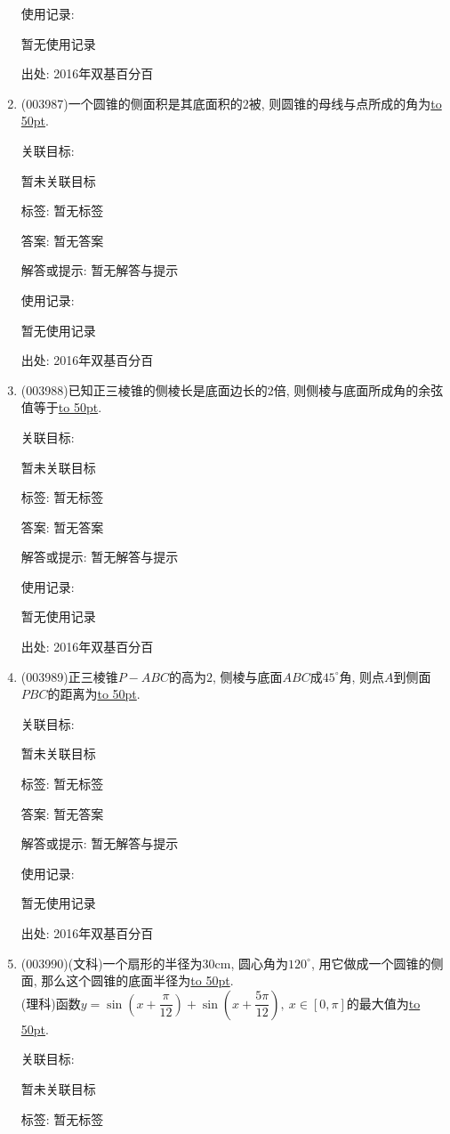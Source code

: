 \documentclass[10pt,a4paper]{article}
\newcommand{\blank}[1]{\underline{\hbox to #1pt{}}}
\begin{document}
\begin{enumerate}[1.]
使用记录:

暂无使用记录


出处: 2016年双基百分百
\item { (003987)}一个圆锥的侧面积是其底面积的$2$被, 则圆锥的母线与点所成的角为\blank{50}.


关联目标:

暂未关联目标



标签: 暂无标签

答案: 暂无答案

解答或提示: 暂无解答与提示

使用记录:

暂无使用记录


出处: 2016年双基百分百
\item { (003988)}已知正三棱锥的侧棱长是底面边长的$2$倍, 则侧棱与底面所成角的余弦值等于\blank{50}.


关联目标:

暂未关联目标



标签: 暂无标签

答案: 暂无答案

解答或提示: 暂无解答与提示

使用记录:

暂无使用记录


出处: 2016年双基百分百
\item { (003989)}正三棱锥$P-ABC$的高为$2$, 侧棱与底面$ABC$成$45^\circ$角, 则点$A$到侧面$PBC$的距离为\blank{50}.


关联目标:

暂未关联目标



标签: 暂无标签

答案: 暂无答案

解答或提示: 暂无解答与提示

使用记录:

暂无使用记录


出处: 2016年双基百分百
\item { (003990)}(文科)一个扇形的半径为$30$cm, 圆心角为$120^\circ$, 用它做成一个圆锥的侧面, 那么这个圆锥的底面半径为\blank{50}.\\
(理科)函数$y=\sin\left(x+\dfrac{\pi}{12}\right)+\sin\left(x+\dfrac{5\pi}{12}\right), \ x\in [0,\pi]$的最大值为\blank{50}.


关联目标:

暂未关联目标



标签: 暂无标签


\end{enumerate}
\end{document}
